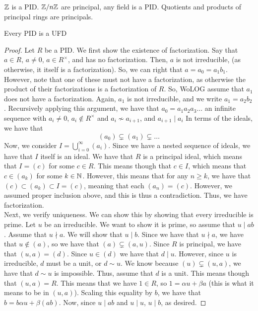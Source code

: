\begin{ex}
    $\mathbb{Z}$ is a PID. $\mathbb{Z} / n \mathbb{Z}$ are principal, any field is a PID. Quotients and products
    of principal rings are principals.
\end{ex}
\begin{thm} \label{Thm 3, Jan 20}
    Every PID is a UFD
\end{thm}
\begin{proof}
    Let $R$ be a PID. We first show the existence of factorization. Say that
    $a \in R$, $a \neq 0$, $a \in R^\times$, and has no factorization. Then,
    $a$ is not irreducible, (as otherwise, it itself is a factorization). So,
    we can right that $a = a_0 = a_1b_1$. However, note that one of these must
    not have a factorization, as otherwise the product of their factorizations
    is a factorization of $R$. So, WoLOG assume that $a_1$ does not have a factorization.
    Again, $a_1$ is not irreducible, and we write $a_1 = a_2b_2$. Recursively
    applying this argument, we have that $a_0 = a_1a_2a_3 \dots$ an infinite sequence with
    $a_i \neq 0$, $a_i \notin R^\times$ and $a_i \not\sim a_{i+1}$, and $a_{i+1} \mid a_{i}$
    In terms of the ideals, we have that
    $$
    (a_0) \subsetneq (a_1) \subsetneq \dots
    $$
    Now, we consider $I = \bigcup\limits_{i=0}^{\infty}{(a_i)}$. Since we have a
    nested sequence of ideals, we have that $I$ itself is an ideal. We have that $R$
    is a principal ideal, which means that $I = (c)$ for some $c \in R$. This means
    though that $c \in I$, which means that $c \in (a_k)$ for some $k \in \mathbb{N}$.
    However, this means that for any $n \geq k$, we have that $(c) \subset (a_k) \subset I = (c)$,
    meaning that each $(a_n) = (c)$. However, we assumed proper inclusion above,
    and this is thus a contradiction. Thus, we have factorization. \\
    Next, we verify uniqueness. We can show this by showing that every irreducible is
    prime. Let $u$ be an irreducible. We want to show it is prime, so assume that $u \mid ab$.
    Assume that $u \nmid a$. We will show that $u \mid b$. Since we have that $u \nmid a$,
    we have that $u \notin (a)$, so we have that $(a) \subsetneq (a, u)$. Since
    $R$ is principal, we have that $(u, a) = (d)$. Since $u \in (d)$ we have that $d \mid u$.
    However, since $u$ is irreducible, $d$ must be a unit, or $d \sim u$. We know because
    $(u) \subsetneq (u,a)$, we have that $d \sim u$ is impossible. Thus, assume that
    $d$ is a unit. This means though that $(u,a)  = R$. This means that we have $1 \in R$,
    so $1 = \alpha u + \beta a$ (this is what it means to be in $(u,a)$). Scaling
    this equality by $b$, we have that $b = b\alpha u + \beta (ab)$. Now, since $u \mid ab$
    and $u \mid u$, $u \mid b$, as desired.
\end{proof}
